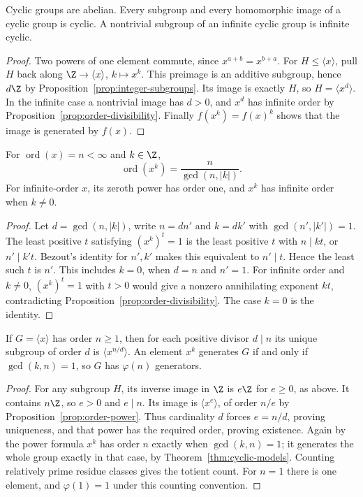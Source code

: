 \begin{proposition}\label{prop:cyclic-subgroups-images}
Cyclic groups are abelian. Every subgroup and every homomorphic image of a cyclic group is cyclic. A nontrivial subgroup of an infinite cyclic group is infinite cyclic.
\end{proposition}
\begin{proof}
Two powers of one element commute, since $x^{a+b}=x^{b+a}$. For $H\leq\langle x\rangle$, pull $H$ back along $\Z\to\langle x\rangle$, $k\mapsto x^k$. This preimage is an additive subgroup, hence $d\Z$ by Proposition~\ref{prop:integer-subgroups}. Its image is exactly $H$, so $H=\langle x^d\rangle$. In the infinite case a nontrivial image has $d>0$, and $x^d$ has infinite order by Proposition~\ref{prop:order-divisibility}. Finally $f(x^k)=f(x)^k$ shows that the image is generated by $f(x)$.
\end{proof}

\begin{proposition}\label{prop:order-power}
For $\operatorname{ord}(x)=n<\infty$ and $k\in\Z$,
\[
 \operatorname{ord}(x^k)=\frac{n}{\gcd(n,|k|)}.
\]
For infinite-order $x$, its zeroth power has order one, and $x^k$ has infinite order when $k\ne0$.
\end{proposition}
\begin{proof}
Let $d=\gcd(n,|k|)$, write $n=dn'$ and $k=dk'$ with $\gcd(n',|k'|)=1$. The least positive $t$ satisfying $(x^k)^t=1$ is the least positive $t$ with $n\mid kt$, or $n'\mid k't$. Bezout's identity for $n',k'$ makes this equivalent to $n'\mid t$. Hence the least such $t$ is $n'$. This includes $k=0$, when $d=n$ and $n'=1$. For infinite order and $k\ne0$, $(x^k)^t=1$ with $t>0$ would give a nonzero annihilating exponent $kt$, contradicting Proposition~\ref{prop:order-divisibility}. The case $k=0$ is the identity.
\end{proof}

\begin{theorem}\label{thm:finite-cyclic-subgroups}
If $G=\langle x\rangle$ has order $n\geq1$, then for each positive divisor $d\mid n$ its unique subgroup of order $d$ is $\langle x^{n/d}\rangle$. An element $x^k$ generates $G$ if and only if $\gcd(k,n)=1$, so $G$ has $\varphi(n)$ generators.
\end{theorem}
\begin{proof}
For any subgroup $H$, its inverse image in $\Z$ is $e\Z$ for $e\geq0$, as above. It contains $n\Z$, so $e>0$ and $e\mid n$. Its image is $\langle x^e\rangle$, of order $n/e$ by Proposition~\ref{prop:order-power}. Thus cardinality $d$ forces $e=n/d$, proving uniqueness, and that power has the required order, proving existence. Again by the power formula $x^k$ has order $n$ exactly when $\gcd(k,n)=1$; it generates the whole group exactly in that case, by Theorem~\ref{thm:cyclic-models}. Counting relatively prime residue classes gives the totient count. For $n=1$ there is one element, and $\varphi(1)=1$ under this counting convention.
\end{proof}

